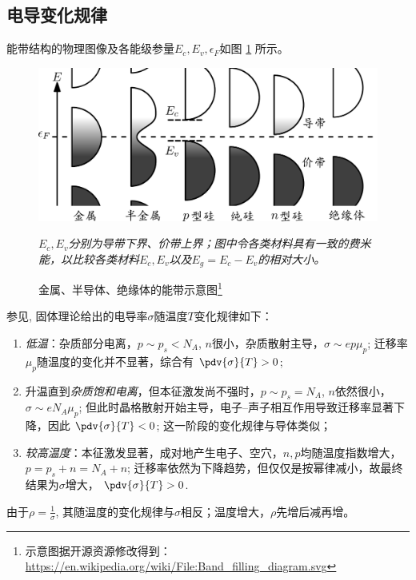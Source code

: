 \documentclass[aps,pre,12pt,preprint,%
	onecolumn,showpacs,showkeys,nofootinbib]{revtex4-1}
\begin{document}
\subsection{电导变化规律}
	能带结构的物理图像及各能级参量$E_c,E_v,\epsilon_F$如图 \ref{fig:bandFilling} 所示。
	\begin{figure}[!h]
	\vspace{.8ex}
	\includegraphics[width=.75\linewidth]{Band_filling.png}
	\caption[能带示意图]{金属、半导体、绝缘体的能带示意图\footnote{%
		示意图据开源资源修改得到：
		\url{https://en.wikipedia.org/wiki/File:Band_filling_diagram.svg}
	}}\vspace{1ex}
	\raggedright\small
	\textit{\hphantom{说明}
		$E_c,E_v$分别为导带下界、价带上界；图中令各类材料具有一致的费米能，以比较各类材料$E_c,E_v$以及$E_g = E_c - E_v$的相对大小。
	\vspace{1ex}}
	\label{fig:bandFilling}
	\end{figure}
	
	参见\cite{textbook}, 固体理论给出的电导率$\sigma$随温度$T$变化规律如下：
	\begin{enumerate}
	\item \textit{低温}：杂质部分电离，$p\sim p_s < N_A$, $n$很小，杂质散射主导，$\sigma \sim ep\mu_p$; 迁移率$\mu_p$随温度的变化并不显著，综合有
		$\pdv{\sigma}{T} > 0$; 
	\item 升温直到\textit{杂质饱和电离}，但本征激发尚不强时，$p\sim p_s = N_A$, $n$依然很小，$\sigma \sim eN_A\mu_p$; 但此时晶格散射开始主导，电子--声子相互作用导致迁移率显著下降，因此
		$\pdv{\sigma}{T} < 0$; 
	这一阶段的变化规律与导体类似；
	\item \textit{较高温度}：本征激发显著，成对地产生电子、空穴，$n,p$均随温度指数增大，$p = p_s + n = N_A + n$; 迁移率依然为下降趋势，但仅仅是按幂律减小，故最终结果为$\sigma$增大，
		$\pdv{\sigma}{T} > 0$. 
	\end{enumerate}
	由于$\rho = \frac{1}{\sigma}$, 其随温度的变化规律与$\sigma$相反；温度增大，$\rho$先增后减再增。
	
\end{document}
